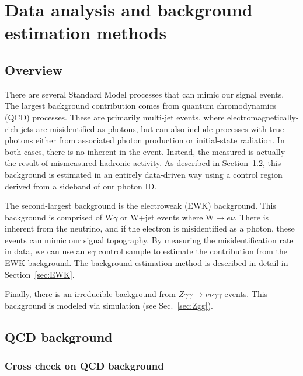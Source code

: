 \chapter{Data analysis and background estimation methods}
\label{chap:DataAnalysis}

\section{Overview}

There are several Standard Model processes that can mimic our signal events. The largest background contribution comes from quantum chromodynamics (QCD) processes. These are primarily multi-jet events, where electromagnetically-rich jets are misidentified as photons, but can also include processes with true photons either from associated photon production or initial-state radiation. In both cases, there is no inherent \ETmiss in the event. Instead, the measured \ETmiss is actually the result of mismeasured hadronic activity. As described in Section~\ref{sec:QCD}, this background is estimated in an entirely data-driven way using a control region derived from a sideband of our photon ID. 

The second-largest background is the electroweak (EWK) background. This background is comprised of W$\gamma$ or W+jet events where W$\rightarrow e \nu$. There is inherent \ETmiss from the neutrino, and if the electron is misidentified as a photon, these events can mimic our signal topography. By measuring the misidentification rate in data, we can use an $e\gamma$ control sample to estimate the contribution from the EWK background. The background estimation method is described in detail in Section~\ref{sec:EWK}. 

Finally, there is an irreducible background from $Z\gamma\gamma\rightarrow\nu\nu\gamma\gamma$ events. This background is modeled via simulation (see Sec.~\ref{sec:Zgg}).


\section{QCD background}
\label{sec:QCD}

\subsection{Cross check on QCD background}
\label{sec:crossCheck}


